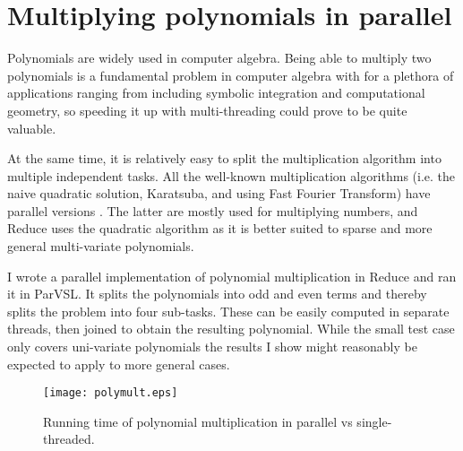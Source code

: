 \section{Multiplying polynomials in parallel}

Polynomials are widely used in computer algebra. Being able
to multiply two polynomials is a fundamental problem in computer
algebra with for a plethora of applications ranging from
including symbolic integration and computational geometry,
so speeding it up with multi-threading could prove to be quite valuable.

At the same time, it is relatively easy to split the multiplication
algorithm into multiple independent tasks. All the well-known
multiplication algorithms (i.e. the naive quadratic solution, Karatsuba,
and using Fast Fourier Transform) have parallel versions \cite[Chapter~30.3]{cormen}.
The latter are mostly used for multiplying numbers, and Reduce
uses the quadratic algorithm as it is better suited to sparse and
more general multi-variate polynomials.

I wrote a parallel implementation of polynomial multiplication in Reduce
and ran it in ParVSL. It splits the polynomials into odd and even
terms and thereby splits the problem into four sub-tasks. These can be
easily computed in separate threads, then joined to obtain the
resulting polynomial. While the small test case only covers uni-variate
polynomials the results I show might reasonably be expected to apply to
more general cases.


\begin{figure}[H]
  \centering
  \texttt{[image: polymult.eps]}
  \caption{Running time of polynomial multiplication in parallel vs single-threaded.}
  \label{fig:parpolymult}
\end{figure}

